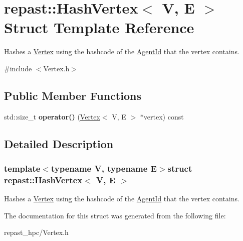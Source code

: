 \hypertarget{structrepast_1_1_hash_vertex}{\section{repast\-:\-:Hash\-Vertex$<$ V, E $>$ Struct Template Reference}
\label{structrepast_1_1_hash_vertex}
}


Hashes a \hyperlink{classrepast_1_1_vertex}{Vertex} using the hashcode of the \hyperlink{classrepast_1_1_agent_id}{Agent\-Id} that the vertex contains.  




{\ttfamily \#include $<$Vertex.\-h$>$}

\subsection*{Public Member Functions}
\begin{DoxyCompactItemize}
\item 
\hypertarget{structrepast_1_1_hash_vertex_a675c035c3939548181bce7e09bcb01b0}{std\-::size\-\_\-t {\bfseries operator()} (\hyperlink{classrepast_1_1_vertex}{Vertex}$<$ V, E $>$ $\ast$vertex) const }\label{structrepast_1_1_hash_vertex_a675c035c3939548181bce7e09bcb01b0}

\end{DoxyCompactItemize}


\subsection{Detailed Description}
\subsubsection*{template$<$typename V, typename E$>$struct repast\-::\-Hash\-Vertex$<$ V, E $>$}

Hashes a \hyperlink{classrepast_1_1_vertex}{Vertex} using the hashcode of the \hyperlink{classrepast_1_1_agent_id}{Agent\-Id} that the vertex contains. 

The documentation for this struct was generated from the following file\-:\begin{DoxyCompactItemize}
\item 
repast\-\_\-hpc/Vertex.\-h\end{DoxyCompactItemize}
